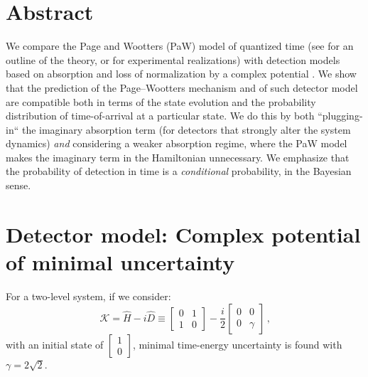 \documentclass[a0,portrait]{a0poster}
\DeclareMathOperator*{\repr}{\equiv}      %
\begin{document}
\begin{multicols}{2} %


\color{Navy} %

\section*{\large Abstract}
We compare the Page and Wootters (PaW) model of quantized time
(see \cite{PageWootters, Lloyd:Time} for an outline of the theory,
or \cite{Moreva:illustration, Moreva_position} for experimental realizations)
with detection models based on absorption and loss of normalization
by a complex potential \cite{RuschhauptAbsorption}. We show that the prediction
of the Page--Wootters mechanism and of such detector model are compatible both in terms
of the state evolution and
the probability distribution of
time-of-arrival at a particular state.
We do this by both ``plugging-in``
the imaginary absorption term (for detectors that strongly alter the system dynamics)
\emph{and} considering a weaker absorption regime, where the PaW model makes
the imaginary term in the Hamiltonian unnecessary. We emphasize that the probability
of detection in time is a \emph{conditional}
probability, in the Bayesian \cite{Maccone:QMOT} sense.



\setlength{\parindent}{1.5em} %


\large

\color{DarkSlateGray} %

\section*{Detector model: Complex potential of minimal uncertainty \cite{RuschhauptAbsorption}}

For a two-level system, if we consider:
\begin{equation}\label{eq:complexpot}
  \mathcal{K} = \hat{H} - i\hat{D} \repr
    \left[\begin{matrix}0 & 1\\1 & 0\end{matrix}\right] -
    \frac{i}{2} \left[\begin{matrix}0 & 0\\0 & \gamma \end{matrix}\right]
    \,\text{,}
\end{equation}
with an initial state of $\left[\begin{matrix}1\\0\end{matrix}\right]$,
minimal time-energy uncertainty is found with $\gamma = 2\sqrt{2}$.


\end{multicols}
\end{document}

